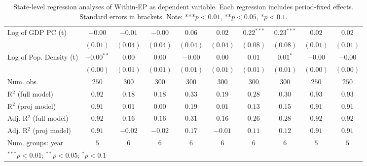 \begin{table}
\begin{center}
\begin{tabular}{l c c c c c c c c c}
Log of GDP PC (t)             & $-0.00$      & $-0.01$  & $-0.00$  & $0.06$       & $0.02$   & $0.22^{***}$  & $0.23^{***}$  & $0.02$       & $0.02$       \\
                              & $(0.01)$     & $(0.04)$ & $(0.04)$ & $(0.04)$     & $(0.04)$ & $(0.08)$      & $(0.08)$      & $(0.01)$     & $(0.01)$     \\
Log of Pop. Density (t)       & $-0.00^{**}$ & $0.00$   & $0.00$   & $-0.00$      & $0.00$   & $0.01$        & $0.01^{*}$    & $-0.00$      & $-0.00$      \\
                              & $(0.00)$     & $(0.01)$ & $(0.01)$ & $(0.01)$     & $(0.01)$ & $(0.01)$      & $(0.01)$      & $(0.00)$     & $(0.00)$     \\
\hline
Num. obs.                     & $250$        & $300$    & $300$    & $300$        & $300$    & $300$         & $300$         & $250$        & $250$        \\
R$^2$ (full model)            & $0.92$       & $0.18$   & $0.18$   & $0.33$       & $0.19$   & $0.28$        & $0.30$        & $0.93$       & $0.93$       \\
R$^2$ (proj model)            & $0.91$       & $0.01$   & $0.00$   & $0.19$       & $0.01$   & $0.13$        & $0.15$        & $0.91$       & $0.91$       \\
Adj. R$^2$ (full model)       & $0.92$       & $0.16$   & $0.16$   & $0.31$       & $0.16$   & $0.26$        & $0.28$        & $0.92$       & $0.92$       \\
Adj. R$^2$ (proj model)       & $0.91$       & $-0.02$  & $-0.02$  & $0.17$       & $-0.01$  & $0.11$        & $0.12$        & $0.91$       & $0.91$       \\
Num. groups: year             & $5$          & $6$      & $6$      & $6$          & $6$      & $6$           & $6$           & $5$          & $5$          \\
\hline
\multicolumn{10}{l}{\scriptsize{$^{***}p<0.01$; $^{**}p<0.05$; $^{*}p<0.1$}}
\end{tabular}
\caption{State-level regression analyses of Within-EP as dependent variable. Each regression includes period-fixed effects. Standard errors in brackets. Note: ***$p<0.01$, **$p<0.05$, *$p<0.1$.}
\label{tab:within_epi_2}
\end{center}
\end{table}

